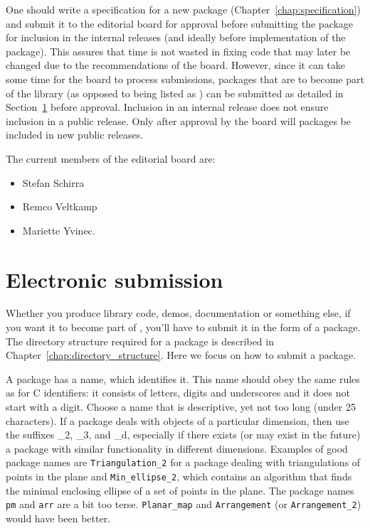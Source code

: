 One should write a specification for a new package
(Chapter~\ref{chap:specification}) and submit it to the editorial board for 
approval before submitting the package for inclusion in the internal
releases (and ideally before implementation of the package).  This
assures that time is not wasted in fixing code that may later be changed
due to the recommendations of the board.
However, since it can take some time for the board to process
submissions, packages that are to become part of the library 
(as opposed to being listed as 
) can be submitted as detailed in 
Section~\ref{sec:electronic_submission} before approval.
Inclusion in an internal release does not ensure inclusion in a public
release.  Only after approval by the board will packages be included in new
public releases.

The current members of the editorial board are:
\begin{itemize}
   \item Stefan Schirra
   \item Remco Veltkamp
   \item Mariette Yvinec.
\end{itemize}


\section{Electronic submission}
\label{sec:electronic_submission}

Whether you produce library code, demos, documentation or something else,
if you want it to become part of \cgal, you'll have to submit it in the form
of a package.  The directory structure required for a package is described in
Chapter~\ref{chap:directory_structure}.
Here we focus on how to submit a package.

A package has a name, which identifies it.  This name should obey the same
rules as for C identifiers: it consists of letters, digits and underscores and
it does not start with a digit.  Choose a name that is descriptive, yet not
too long (under 25 characters).  If a package deals with objects of a
particular dimension, then use the suffixes \_2, \_3, and \_d, especially if
there exists (or may exist in the future) a package with similar
functionality in different dimensions.  Examples of good package names are
\texttt{Triangulation\_2} for a package dealing with triangulations of points 
in the plane and \texttt{Min\_ellipse\_2}, which contains an algorithm that 
finds the minimal enclosing ellipse of a set of points in the plane. The 
package names \texttt{pm} and \texttt{arr} are a bit too terse.
\texttt{Planar\_map} and \texttt{Arrangement} (or
\texttt{Arrangement\_2}) would have been better.

